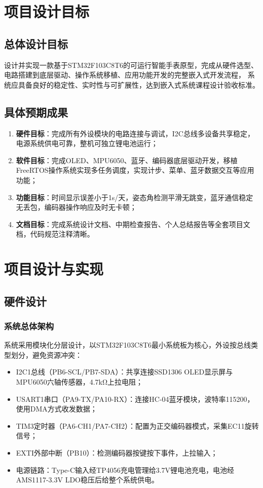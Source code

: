 \documentclass[12pt, a4paper]{ctexart}
\begin{document}
\section{项目设计目标}
\subsection{总体设计目标}
设计并实现一款基于STM32F103C8T6的可运行智能手表原型，完成从硬件选型、电路搭建到底层驱动、操作系统移植、应用功能开发的完整嵌入式开发流程，
系统应具备良好的稳定性、实时性与可扩展性，达到嵌入式系统课程设计验收标准。

\subsection{具体预期成果}
\begin{enumerate}
    \item \textbf{硬件目标}：完成所有外设模块的电路连接与调试，I2C总线多设备共享稳定，电源系统供电可靠，整机可独立锂电池运行；
    \item \textbf{软件目标}：完成OLED、MPU6050、蓝牙、编码器底层驱动开发，移植FreeRTOS操作系统实现多任务调度，实现计步、菜单、蓝牙数据交互等应用功能；
    \item \textbf{功能目标}：时间显示误差小于1s/天，姿态角检测平滑无跳变，蓝牙通信稳定无丢包，编码器操作响应及时无卡顿；
    \item \textbf{文档目标}：完成系统设计文档、中期检查报告、个人总结报告等全套项目文档，代码规范注释清晰。
\end{enumerate}

\section{项目设计与实现}
\subsection{硬件设计}
\subsubsection{系统总体架构}
系统采用模块化分层设计，以STM32F103C8T6最小系统板为核心，外设按总线类型划分，避免资源冲突：
\begin{itemize}
    \item I2C1总线（PB6-SCL/PB7-SDA）：共享连接SSD1306 OLED显示屏与MPU6050六轴传感器，4.7kΩ上拉电阻；
    \item USART1串口（PA9-TX/PA10-RX）：连接HC-04蓝牙模块，波特率115200，使用DMA方式收发数据；
    \item TIM3定时器（PA6-CH1/PA7-CH2）：配置为正交编码器模式，采集EC11旋转信号；
    \item EXTI外部中断（PB10）：检测编码器按键按下事件，上拉输入；
    \item 电源链路：Type-C输入经TP4056充电管理给3.7V锂电池充电，电池经AMS1117-3.3V LDO稳压后给整个系统供电。
\end{itemize}
\end{document}
